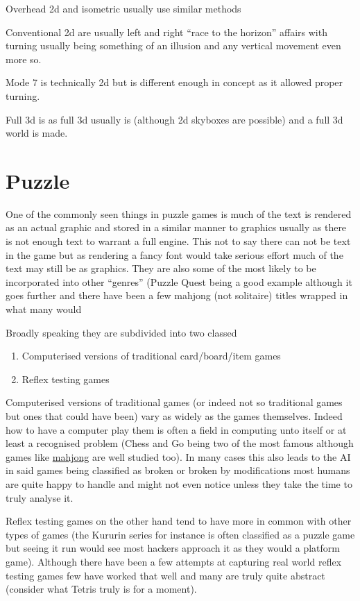 \documentclass[
]{book}
\providecommand{\tightlist}{%
  \setlength{\itemsep}{0pt}\setlength{\parskip}{0pt}}
\begin{document}
Overhead 2d and isometric usually use similar methods

Conventional 2d are usually left and right ``race to the horizon'' affairs with turning usually being something of an illusion and any vertical movement even more so.

Mode 7 is technically 2d but is different enough in concept as it allowed proper turning.

Full 3d is as full 3d usually is (although 2d skyboxes are possible) and a full 3d world is made.

\hypertarget{puzzle}{%
\section{Puzzle}\label{puzzle}}

One of the commonly seen things in puzzle games is much of the text is rendered as an actual graphic and stored in a similar manner to graphics usually as there is not enough text to warrant a full engine. This not to say there can not be text in the game but as rendering a fancy font would take serious effort much of the text may still be as graphics. They are also some of the most likely to be incorporated into other ``genres'' (Puzzle Quest being a good example although it goes further and there have been a few mahjong (not solitaire) titles wrapped in what many would

Broadly speaking they are subdivided into two classed

\begin{enumerate}
\def\labelenumi{\arabic{enumi}.}
\tightlist
\item
  Computerised versions of traditional card/board/item games
\item
  Reflex testing games
\end{enumerate}

Computerised versions of traditional games (or indeed not so traditional games but ones that could have been) vary as widely as the games themselves. Indeed how to have a computer play them is often a field in computing unto itself or at least a recognised problem (Chess and Go being two of the most famous although games like \href{http://cs229.stanford.edu/proj2009/Loh.pdf}{mahjong} are well studied too). In many cases this also leads to the AI in said games being classified as broken or broken by modifications most humans are quite happy to handle and might not even notice unless they take the time to truly analyse it.

Reflex testing games on the other hand tend to have more in common with other types of games (the Kururin series for instance is often classified as a puzzle game but seeing it run would see most hackers approach it as they would a platform game). Although there have been a few attempts at capturing real world reflex testing games few have worked that well and many are truly quite abstract (consider what Tetris truly is for a moment).
\end{document}
